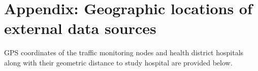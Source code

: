 \section{Appendix: Geographic locations of external data sources}\label{appendix_c}

GPS coordinates of the traffic monitoring nodes and health district hospitals along with their geometric distance to study hospital are provided below.

\setcounter{table}{0}
\renewcommand{\thetable}{C\arabic{table}}
\setcounter{figure}{0}
\renewcommand{\thefigure}{C\arabic{figure}}





\pagebreak